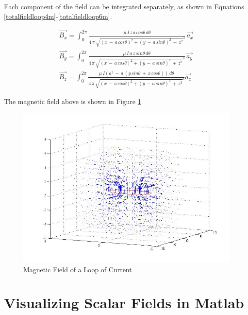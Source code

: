 \documentclass{ximera}
\begin{document}
Each component of the field can be  integrated separately, as shown in Equations \ref{totalfieldloop4m}-\ref{totalfieldloop6m}.



\begin{eqnarray}
\vec{B_x}= \int_0^{2\pi}\frac{\mu\,  I\,  z\,  a\,  cos\theta \, d\theta}{4 \, \pi\,  \sqrt{(x\,  - \, a \,cos{\theta})^2 +(y \,- \,a \,sin{\theta})^2 \,+\,z ^2}^3 }  \, \vec{a_x} \label{totalfieldloop4m} \\
\vec{B_y}=  \int_0^{2\pi} \frac{\mu \, I \, a \, z\, sin\theta\, d\theta}{4\, \pi \, \sqrt{(x \,-\,  a \,cos{\theta})^2 +(y \, - \, a \,sin{\theta})^2 \,+\, z ^2}^3 }  \, \vec{a_y} \label{totalfieldloop5m} \\
\vec{B_z}=  \int_0^{2\pi} \frac{\mu  \,I(a^2 \,-\,a\, (y\, sin\theta \,+\, x\, cos\theta))\,d\theta}{4 \,\pi\, \sqrt{(x\, -\, a \,cos{\theta})^2 +(y\, -\, a \,sin{\theta})^2 \,+\,z ^2}^3 }  \vec{a_z} \label{totalfieldloop6m}
\end{eqnarray}

The magnetic field above is shown in Figure \ref{mflmat}

\begin{figure}[htbp]
\begin{center}
\includegraphics[scale=0.3]{../jpg/bfieldloop.jpg}
\end{center}
\caption{Magnetic Field of a Loop of Current }
\label{mflmat}
\end{figure}



\section{Visualizing Scalar Fields in Matlab}
\end{document}
